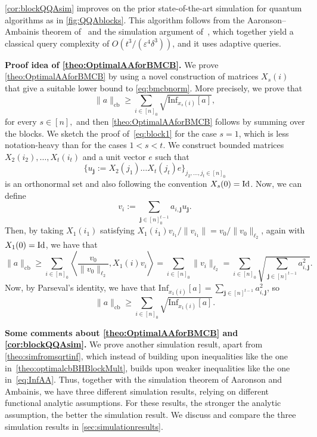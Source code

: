 \documentclass[11pt]{article}
\DeclareMathOperator{\cb}{cb}
\newcommand{\norm}[1]{\|#1\|}
\newcommand{\1}{\mathbf{1}}
\newcommand{\Id}{\ensuremath{\mathop{\rm Id}\nolimits}}
\newcommand\Inf{\mathrm{Inf}}
\newcommand{\eps}{\varepsilon}
\newcommand{\ind}[1]{\mathbf{#1}}
\theoremstyle{plain}
\theoremstyle{definition}
\theoremstyle{remark}
\begin{document}
\cref{cor:blockQQAsim} improves on the prior state-of-the-art simulation for quantum algorithms as in \cref{fig:QQAblocks}. This algorithm follows from the Aaronson--Ambainis theorem of~\cite{gutierrez2023influences} and the simulation argument of~\cite[Theorem 22]{Aaronsons:2014}, which together yield a classical query complexity of $O(t^3/(\eps^4\delta^3))$, and it uses adaptive queries.

\vspace{0.3cm}
\noindent\textbf{Proof idea of \cref{theo:OptimalAAforBMCB}.} We prove \cref{theo:OptimalAAforBMCB} by using a novel construction of matrices $X_s(i)$ that give a suitable lower bound to \cref{eq:bmcbnorm}. More precisely, we prove that 
\begin{equation}\label{eq:block1}
    \norm{a}_{\cb}\geq \sum_{i\in [n]_0}\sqrt{\Inf_{x_s(i)}[a]},
\end{equation}
for every $s\in [n],$ and then \cref{theo:OptimalAAforBMCB} follows by summing over the blocks. We sketch the proof of~\cref{eq:block1} for the case $s=1$, which is less notation-heavy than for the cases $1<s<t$. We construct bounded matrices $X_2(i_2),\dots,X_t(i_t)$ and a unit vector $e$ such that $$\{u_{\ind j}:=X_2(j_1)\dots X_t(j_t)e\}_{j_2,\dots,j_t\in [n]_0}$$ is an orthonormal set and also following the convention $X_s(0)=\Id$. Now, we can define $$v_i:=\sum_{\ind j\in [n]_0^{t-1}}a_{i,\ind j}u_\ind j.$$ Then, by taking $X_1(i_1)$ satisfying $X_1(i_1)v_{i_1}/\norm{v_{i_1}}=v_0/\norm{v_0}_{\ell_2}$, again with $X_1(0)=\Id$, we have that 
\begin{equation*}
    \norm{a}_{\cb}\geq \sum_{i\in [n]_0} \left\langle \frac{v_0}{\norm{v_0}_{\ell_2}},X_1(i)v_{i}\right\rangle=\sum_{i\in [n]_0}\norm{v_i}_{\ell_2}=\sum_{i\in [n]_0}\sqrt{\sum_{\ind j\in [n]^{t-1}}a_{i,\ind j}^2}.
\end{equation*}
Now, by Parseval's identity, we have that $\Inf_{x_1(i)}[a]=\sum_{\ind j\in [n]^{t-1}}a_{i,\ind j}^2$, so 
\begin{equation*}
    \norm{a}_{\cb}\geq \sum_{i\in [n]_0}\sqrt{\Inf_{x_1(i)}[a]}.
\end{equation*}

\vspace{0.3cm}
\noindent\textbf{Some comments about \cref{theo:OptimalAAforBMCB} and \cref{cor:blockQQAsim}.} We prove another simulation result, apart from \cref{theo:simfromsqrtinf}, which instead of building upon inequalities like the one in~\cref{theo:optimalcbBHBlockMult}, builds upon weaker inequalities like the one in~\cref{eq:InfAA}. Thus, together with the simulation theorem of Aaronson and Ambainis, we have three different simulation results, relying on different functional analytic assumptions. For these results, the stronger the analytic assumption, the better the simulation result. We discuss and compare the three simulation results in \cref{sec:simulationresults}.
\end{document}
